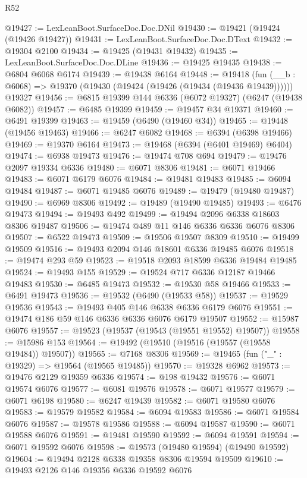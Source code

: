 \begin{lexlean}{R52}
\begin{coremodule}
@19427 := LexLeanBoot.SurfaceDoc.Doc.DNil
@19430 := @19421 (@19424 (@19426 @19427))
@19431 := LexLeanBoot.SurfaceDoc.Doc.DText
@19432 := @19304 @2100
@19434 := @19425 (@19431 @19432)
@19435 := LexLeanBoot.SurfaceDoc.Doc.DLine
@19436 := @19425 @19435
@19438 := @6804 @6068 @6174
@19439 := @19438 @6164
@19448 := @19418
    (fun (__b : @6068) => @19370 (@19430 (@19424 (@19426 (@19434 (@19436 @19439))))))
    @19327
@19456 := @6815 @19399 @144 @6336 (@6072 @19327) (@6247 (@19438 @6082))
@19457 := @6485 @19399
@19459 := @19457 @34 @19371
@19460 := @6491 @19399
@19463 := @19459 (@6490 (@19460 @34))
@19465 := @19448 (@19456 @19463)
@19466 := @6247 @6082
@19468 := @6394 (@6398 @19466)
@19469 := @19370 @6164
@19473 := @19468 (@6394 (@6401 @19469) @6404)
@19474 := @6938 @19473
@19476 := @19474 @708 @694
@19479 := @19476 @2097 @19334 @6336
@19480 := @6071 @8306
@19481 := @6071 @19466
@19483 := @6071 @6179 @6076
@19484 := @19481 @19483
@19485 := @6094 @19484
@19487 := @6071 @19485 @6076
@19489 := @19479 (@19480 @19487)
@19490 := @6969 @8306
@19492 := @19489 (@19490 @19485)
@19493 := @6476 @19473
@19494 := @19493 @492
@19499 := @19494 @2096 @6338 @18603 @8306 @19487
@19506 := @19474 @489 @11 @146 @6336 @6336 @6076 @8306
@19507 := @6522 @19473
@19509 := @19506 @19507 @8309
@19510 := @19499 @19509
@19516 := @19493 @2094 @146 @18601 @6336 @19485 @6076
@19518 := @19474 @293 @59
@19523 := @19518 @2093 @18599 @6336 @19484 @19485
@19524 := @19493 @155
@19529 := @19524 @717 @6336 @12187 @19466 @19483
@19530 := @6485 @19473
@19532 := @19530 @58 @19466
@19533 := @6491 @19473
@19536 := @19532 (@6490 (@19533 @58))
@19537 := @19529 @19536
@19543 := @19493 @405 @146 @6338 @6336 @6179 @6076
@19551 := @19474 @186 @59 @146 @6336 @6336 @6076 @6179 @19507
@19552 := @15987 @6076
@19557 := @19523 (@19537 (@19543 (@19551 @19552) @19507))
@19558 := @15986 @153
@19564 := @19492 (@19510 (@19516 (@19557 (@19558 @19484)) @19507))
@19565 := @7168 @8306
@19569 := @19465 (fun ("_" : @19329) => @19564 (@19565 @19485))
@19570 := @19328 @6962
@19573 := @19476 @2129 @19359 @6336
@19574 := @198 @19432
@19576 := @6071 @19574 @6076
@19577 := @6081 @19576
@19578 := @6071 @19577
@19579 := @6071 @6198
@19580 := @6247 @19439
@19582 := @6071 @19580 @6076
@19583 := @19579 @19582
@19584 := @6094 @19583
@19586 := @6071 @19584 @6076
@19587 := @19578 @19586
@19588 := @6094 @19587
@19590 := @6071 @19588 @6076
@19591 := @19481 @19590
@19592 := @6094 @19591
@19594 := @6071 @19592 @6076
@19598 := @19573 (@19480 @19594) (@19490 @19592)
@19604 := @19494 @2128 @6338 @19358 @8306 @19594 @19509
@19610 := @19493 @2126 @146 @19356 @6336 @19592 @6076

\end{coremodule}
\end{lexlean}
